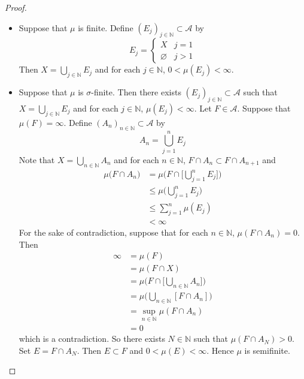 \documentclass{book}
\theoremstyle{definition}
\newcommand{\sig}{\sigma}
\newcommand{\N}{\mathbb{N}}
\newcommand{\MA}{\mathcal{A}}
\DeclareMathOperator*{\0}{\mbf{0}}
\DeclareMathOperator*{\1}{\mbf{1}}
\begin{document}
	\begin{proof}\
		\begin{itemize}
			\item Suppose that $\mu$ is finite. Define $(E_j)_{j \in \N} \subset \MA$ by 
			\[E_j =
			\begin{cases}
				X & j=1 \\
				\varnothing & j > 1
			\end{cases}
			\]
			Then $X = \bigcup\limits_{j \in \N} E_j$ and for each $j \in \N$, $0 < \mu(E_j) < \infty$.
			\item Suppose that $\mu$ is $\sig$-finite. Then there exists $(E_j)_{j \in \N} \subset \MA$ such that $X = \bigcup\limits_{j \in \N} E_j$
			and for each $j \in \N$, $\mu(E_j) < \infty$. Let $F \in \MA$. Suppose that $\mu(F) = \infty$. Define $(A_n)_{n \in \N} \subset \MA$ by 
			$$A_n = \bigcup_{j=1}^n E_j$$
			Note that $X = \bigcup\limits_{n \in \N} A_n$ and for each $n \in \N$, $F \cap A_n \subset F \cap A_{n+1}$ and 
			\begin{align*}
				\mu \bigg (F \cap A_n \bigg)  
				& = \mu \bigg (F \cap \bigg[ \bigcup_{j=1}^n E_j \bigg] \bigg)  \\
				& \leq \mu \bigg (\bigcup_{j=1}^n E_j \bigg) \\
				& \leq \sum_{j=1}^n \mu(E_j) \\
				& < \infty
			\end{align*}
			For the sake of contradiction, suppose that for each $n \in \N$, $\mu  (F \cap A_n ) = 0$. Then
			\begin{align*}
				\infty 
				& = \mu(F) \\
				& = \mu(F \cap X) \\
				& = \mu\bigg(F \cap \bigg[ \bigcup_{n \in \N} A_n \bigg] \bigg) \\
				& = \mu\bigg(  \bigcup_{n \in \N} [F \cap A_n] \bigg) \\
				& = \sup_{n \in \N} \mu(F \cap A_n) \\
				& = 0
			\end{align*}
			which is a contradiction. So there exists $N \in \N$ such that $\mu  (F \cap A_N ) > 0$. Set $E = F \cap A_N$. Then $E \subset F$ and $0 < \mu(E) < \infty$. Hence $\mu$ is semifinite.
		\end{itemize}
	\end{proof}
\end{document}
